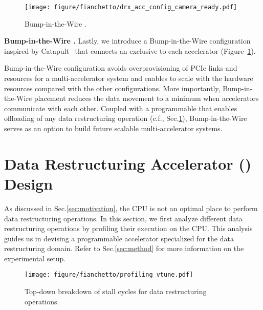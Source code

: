 \begin{figure}[ht!]
    \centering
    \texttt{[image: figure/fianchetto/drx\_acc\_config\_camera\_ready.pdf]}
    \caption{Bump-in-the-Wire \drx.
    }
    \label{fig:drx-config-acc}
\end{figure}

\noindent\textbf{Bump-in-the-Wire \drx.}
Lastly, we introduce a Bump-in-the-Wire \drx configuration 
inspired by Catapult~\cite{catapult:isca:2014} that connects an exclusive \drx to each accelerator (Figure~\ref{fig:drx-config-acc}).

Bump-in-the-Wire configuration avoids overprovisioning of PCIe links and \drx resources for a multi-accelerator system and enables \dmx to scale with the hardware resources compared with the other configurations.
%
More importantly, Bump-in-the-Wire \drx placement reduces the data movement to a minimum when accelerators communicate with each other.
%
%
Coupled with a programmable \drx that enables offloading of any data restructuring operation (c.f., Sec.\ref{sec:accelerator}), Bump-in-the-Wire \drx serves as an option to build future scalable multi-accelerator systems.


\section{Data Restructuring Accelerator (\drx) Design}
\label{sec:accelerator}

As discussed in Sec.\ref{sec:motivation}, the CPU is not an optimal place to perform data restructuring operations. 
In this section, we first analyze different data restructuring operations by profiling their execution on the CPU. This analysis guides us in devising a programmable accelerator specialized for the data restructuring domain. Refer to Sec.\ref{sec:method} for more information on the experimental setup. %

\begin{figure}[ht!]
    \centering    
    \texttt{[image: figure/fianchetto/profiling\_vtune.pdf]}
    \caption{Top-down breakdown of stall cycles for data restructuring operations.}
    \label{fig:topdown}
\end{figure}

